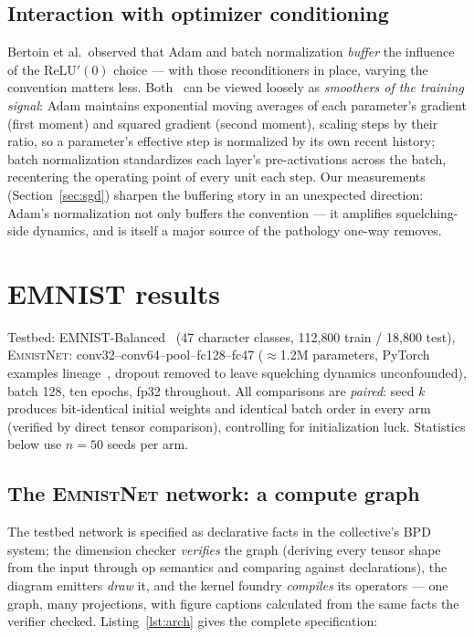 \documentclass[11pt]{article}
\newcommand{\relu}{\mathrm{ReLU}}
\newcommand{\modelEmnistNet}{\textsc{EmnistNet}\xspace}
\begin{document}
\subsection{Interaction with optimizer conditioning}

Bertoin et al.\ observed that Adam and batch normalization \emph{buffer}
the influence of the $\relu'(0)$ choice --- with those reconditioners in
place, varying the convention matters less. Both~\cite{kingma2015adam,ioffe2015bn} can be viewed loosely as
\emph{smoothers of the training signal}: Adam maintains exponential moving
averages of each parameter's gradient (first moment) and squared gradient
(second moment), scaling steps by their ratio, so a parameter's effective
step is normalized by its own recent history; batch normalization
standardizes each layer's pre-activations across the batch, recentering
the operating point of every unit each step. Our measurements
(Section~\ref{sec:sgd}) sharpen the buffering story in an unexpected
direction: Adam's normalization not only buffers the convention --- it
amplifies squelching-side dynamics, and is itself a major source of the
pathology one-way removes.

\section{EMNIST results}
\label{sec:results}

Testbed: EMNIST-Balanced~\cite{cohen2017emnist} (47 character classes, 112{,}800 train /
18{,}800 test), \modelEmnistNet: conv32--conv64--pool--fc128--fc47 ($\approx$1.2M
parameters, PyTorch~\cite{paszke2019pytorch} examples lineage~\cite{lecun1998mnist}, dropout removed to leave
squelching dynamics unconfounded), batch 128, ten epochs, fp32
throughout. All comparisons are \emph{paired}: seed $k$ produces
bit-identical initial weights and identical batch order in every arm
(verified by direct tensor comparison), controlling for initialization
luck. Statistics below use $n{=}50$ seeds per arm.

\subsection{The \modelEmnistNet network: a compute graph}
\label{sec:network}

The testbed network is specified as declarative facts in the
collective's BPD system; the dimension checker \emph{verifies} the
graph (deriving every tensor shape from the input through op semantics
and comparing against declarations), the diagram emitters \emph{draw}
it, and the kernel foundry \emph{compiles} its operators --- one graph,
many projections, with figure captions calculated from the same facts
the verifier checked. Listing~\ref{lst:arch} gives the complete
specification:
\end{document}
